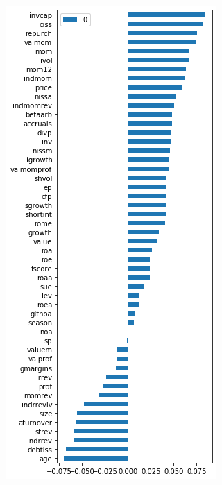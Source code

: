 \documentclass{article}
\begin{document}
\begin{figure}[h]
\begin{minipage}{.5\textwidth}
  \includegraphics[width=.8\linewidth]{Figure_PC2.png}
  \label{eig4}
\end{minipage}
\end{figure}
\end{document}
